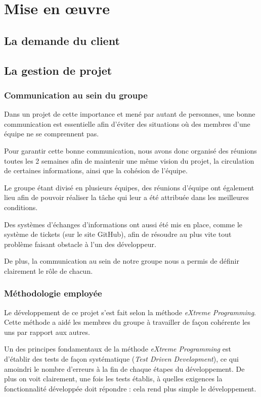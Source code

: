 \chapter{Mise en œuvre}
\section{La demande du client}

 \section{La gestion de projet}
  
  \subsection{Communication au sein du groupe}
  
    Dans un projet de cette importance et mené par autant de personnes, une
    bonne communication est essentielle afin d'éviter des situations où des
    membres d'une équipe ne se comprennent pas.
  
    Pour garantir cette bonne communication, nous avons donc organisé des
    réunions toutes les 2 semaines afin de maintenir une même vision du projet,
    la circulation de certaines informations, ainsi que la cohésion de l'équipe.
  
    Le groupe étant divisé en plusieurs équipes, des réunions d'équipe ont
    également lieu afin de pouvoir réaliser la tâche qui leur a été attribuée
    dans les meilleures conditions.
  
    Des systèmes d'échanges d'informations ont aussi été mis en place, comme le
    système de tickets (sur le site GitHub), afin de résoudre au plus vite tout
    problème faisant obstacle à l'un des développeur.
  
    De plus, la communication au sein de notre groupe nous a permis de définir
    clairement le rôle de chacun.
  
  
  \subsection{Méthodologie employée}
  
    Le développement de ce projet s'est fait selon la méthode \emph{eXtreme
    Programming}. Cette méthode a aidé les membres du groupe à travailler de
    façon cohérente les uns par rapport aux autres.
  
    Un des principes fondamentaux de la méthode \emph{eXtreme Programming} est
    d'établir des tests de façon systématique (\emph{Test Driven Development}),
    ce qui amoindri le nombre d'erreurs à la fin de chaque étapes du
    développement. De plus on voit clairement, une fois les tests établis, à
    quelles exigences la fonctionnalité développée doit répondre : cela rend
    plus simple le développement.
  
